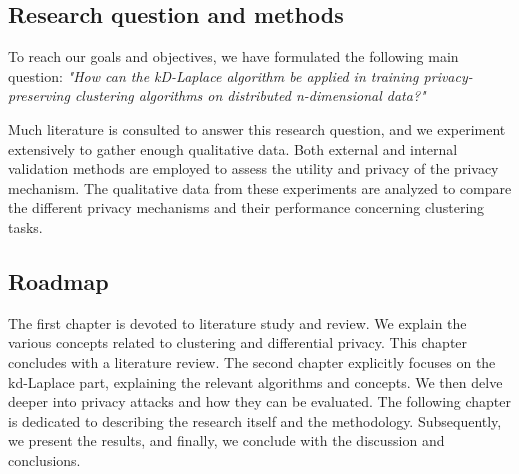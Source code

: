 \subsection*{Research question and methods}
To reach our goals and objectives, we have formulated the following main question: \newline \newline
\textit{"How can the kD-Laplace algorithm be applied in training privacy-preserving clustering algorithms on distributed n-dimensional data?"} \newline

Much literature is consulted to answer this research question, and we experiment extensively to gather enough qualitative data.
Both external and internal validation methods are employed to assess the utility and privacy of the privacy mechanism.
The qualitative data from these experiments are analyzed to compare the different privacy mechanisms and their performance concerning clustering tasks.

\subsection*{Roadmap}
The first chapter is devoted to literature study and review.
We explain the various concepts related to clustering and differential privacy.
This chapter concludes with a literature review.
The second chapter explicitly focuses on the kd-Laplace part, explaining the relevant algorithms and concepts.
We then delve deeper into privacy attacks and how they can be evaluated. \newline
The following chapter is dedicated to describing the research itself and the methodology.
Subsequently, we present the results, and finally, we conclude with the discussion and conclusions.


